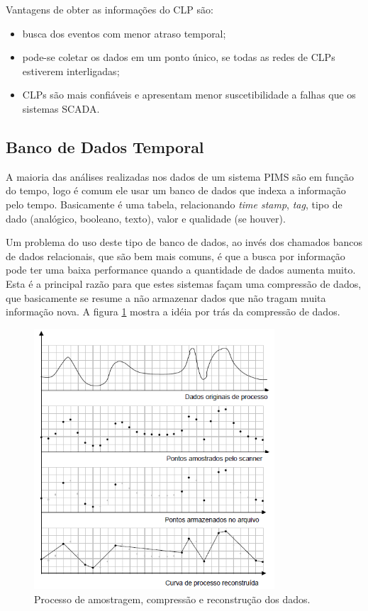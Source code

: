Vantagens de obter as informações do CLP são:
\begin{itemize}
	\item busca dos eventos com menor atraso temporal;
	\item pode-se coletar os dados em um ponto único, se todas as redes de CLPs estiverem interligadas;
	\item CLPs são mais confiáveis e apresentam menor suscetibilidade a falhas que os sistemas SCADA.
\end{itemize}

\subsection{Banco de Dados Temporal}
A maioria das análises realizadas nos dados de um sistema PIMS são em função do tempo, logo é comum ele usar um banco de dados que indexa a informação pelo tempo. Basicamente é uma tabela, relacionando \emph{time stamp}, \emph{tag}, tipo de dado (analógico, booleano, texto), valor e qualidade (se houver).

Um problema do uso deste tipo de banco de dados, ao invés dos chamados bancos de dados relacionais, que são bem mais comuns, é que a busca por informação pode ter uma baixa performance quando a quantidade de dados aumenta muito. Esta é a principal razão para que estes sistemas façam uma compressão de dados, que basicamente se resume a não armazenar dados que não tragam muita informação nova. A figura \ref{fig:reconstrucaoDados} mostra a idéia por trás da compressão de dados.

\begin{figure}[hbt]
	\begin{center}
		\includegraphics[width=0.8\textwidth]{figuras/reconstrucaoDados}
	\end{center}
	\caption{Processo de amostragem, compressão e reconstrução dos dados.} %
	\label{fig:reconstrucaoDados}
\end{figure}

